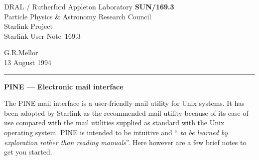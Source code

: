 \pagestyle{myheadings}

\newcommand{\stardoccategory}  {Starlink User Note}
\newcommand{\stardocinitials}  {SUN}
\newcommand{\stardocnumber}    {169.3}
\newcommand{\stardocauthors}   {G.R.Mellor}
\newcommand{\stardocdate}      {13 August 1994}
\newcommand{\stardoctitle}     {PINE --- Electronic mail interface}

\newcommand{\stardocname}{\stardocinitials /\stardocnumber}
\renewcommand{\_}{{\tt\char'137}}     %
\markright{\stardocname}
\setlength{\textwidth}{160mm}
\setlength{\textheight}{230mm}
\setlength{\topmargin}{-2mm}
\setlength{\oddsidemargin}{0mm}
\setlength{\evensidemargin}{0mm}
\setlength{\parindent}{0mm}
\setlength{\parskip}{\medskipamount}
\setlength{\unitlength}{1mm}



\thispagestyle{empty}
DRAL / {\sc Rutherford Appleton Laboratory} \hfill {\bf \stardocname}\\
{\large Particle Physics \& Astronomy Research Council}\\
{\large Starlink Project\\}
{\large \stardoccategory\ \stardocnumber}
\begin{flushright}
\stardocauthors\\
\stardocdate
\end{flushright}
\vspace{-4mm}
\rule{\textwidth}{0.5mm}
\vspace{5mm}
\begin{center}
{\Large\bf \stardoctitle}
\end{center}
\vspace{5mm}


The PINE mail interface is a user-friendly mail utility for Unix systems.
It has been adopted by Starlink as the recommended mail utility because
of its ease of use compared with the mail utilities supplied as standard with
the Unix operating system. PINE is intended to be intuitive and ``{\it 
to be learned by exploration rather than reading manuals}''. Here however
are a few brief notes to get you started.

